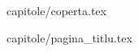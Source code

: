 \documentclass[12pt,oneside]{report}
\begin{document}
 {capitole/coperta.tex}

 {capitole/pagina_titlu.tex}





\tableofcontents


	
\end{document}
